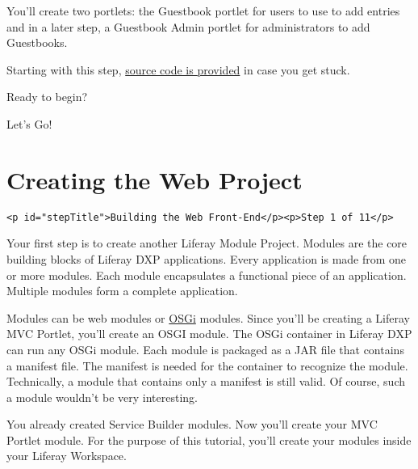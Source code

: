 You'll create two portlets: the Guestbook portlet for users to use to
add entries and in a later step, a Guestbook Admin portlet for
administrators to add Guestbooks.

Starting with this step,
\href{https://github.com/liferay/liferay-docs/tree/master/en/developer/tutorials/code/guestbook/04-web-front-end}{source
code is provided} in case you get stuck.

Ready to begin?

Let's Go!{}

\chapter{Creating the Web Project}\label{creating-the-web-project}

\begin{verbatim}
<p id="stepTitle">Building the Web Front-End</p><p>Step 1 of 11</p>
\end{verbatim}

Your first step is to create another Liferay Module Project. Modules are
the core building blocks of Liferay DXP applications. Every application
is made from one or more modules. Each module encapsulates a functional
piece of an application. Multiple modules form a complete application.

Modules can be web modules or \href{https://www.osgi.org/}{OSGi}
modules. Since you'll be creating a Liferay MVC Portlet, you'll create
an OSGI module. The OSGi container in Liferay DXP can run any OSGi
module. Each module is packaged as a JAR file that contains a manifest
file. The manifest is needed for the container to recognize the module.
Technically, a module that contains only a manifest is still valid. Of
course, such a module wouldn't be very interesting.

You already created Service Builder modules. Now you'll create your MVC
Portlet module. For the purpose of this tutorial, you'll create your
modules inside your Liferay Workspace.

